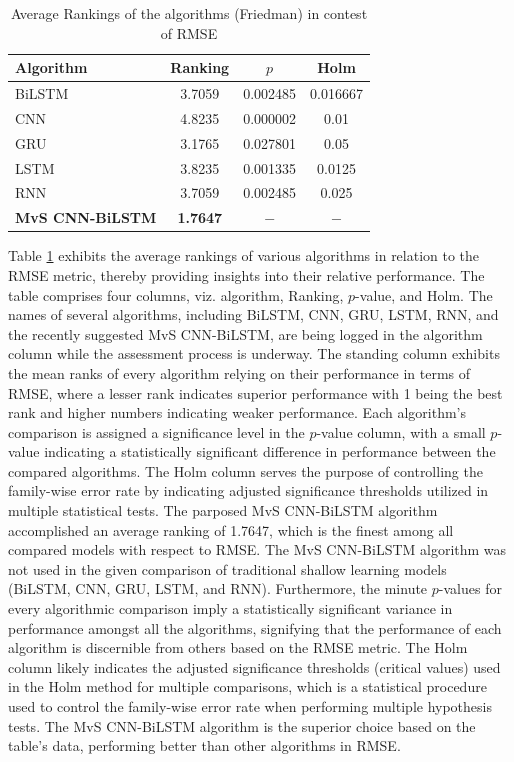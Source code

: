 \documentclass[a4paper,fleqn]{cas-sc}
\begin{document}
\begin{table}[!htp]
  \caption{Average Rankings of the algorithms (Friedman) in contest of RMSE}
  \centering
  \begin{tabular}{lccc}
  \hline
  Algorithm&Ranking&$p$&Holm\\\hline
  BiLSTM&3.7059&0.002485&0.016667\\
  CNN&4.8235&0.000002&0.01\\
  GRU&3.1765&0.027801&0.05\\
  LSTM&3.8235&0.001335&0.0125\\
  RNN&3.7059&0.002485&0.025\\
  \textbf{MvS CNN-BiLSTM}&\textbf{1.7647}&$-$ &$-$ \\\hline
\end{tabular}
\label{rank_rmse}
  \end{table}
  Table \ref{rank_rmse} exhibits the average rankings of various algorithms in relation to the RMSE metric, thereby providing insights into their relative performance. The table comprises four columns, viz. algorithm, Ranking, $p$-value, and Holm. The names of several algorithms, including BiLSTM, CNN, GRU, LSTM, RNN, and the recently suggested MvS CNN-BiLSTM, are being logged in the algorithm column while the assessment process is underway. The standing column exhibits the mean ranks of every algorithm relying on their performance in terms of RMSE, where a lesser rank indicates superior performance with 1 being the best rank and higher numbers indicating weaker performance. Each algorithm's comparison is assigned a significance level in the $p$-value column, with a small $p$-value indicating a statistically significant difference in performance between the compared algorithms. The Holm column serves the purpose of controlling the family-wise error rate by indicating adjusted significance thresholds utilized in multiple statistical tests. The parposed MvS CNN-BiLSTM algorithm accomplished an average ranking of 1.7647, which is the finest among all compared models with respect to RMSE. The MvS CNN-BiLSTM algorithm was not used in the given comparison of traditional shallow learning models (BiLSTM, CNN, GRU, LSTM, and RNN). Furthermore, the minute $p$-values for every algorithmic comparison imply a statistically significant variance in performance amongst all the algorithms, signifying that the performance of each algorithm is discernible from others based on the RMSE metric. The Holm column likely indicates the adjusted significance thresholds (critical values) used in the Holm method for multiple comparisons, which is a statistical procedure used to control the family-wise error rate when performing multiple hypothesis tests. The MvS CNN-BiLSTM algorithm is the superior choice based on the table's data, performing better than other algorithms in RMSE.
\end{document}
